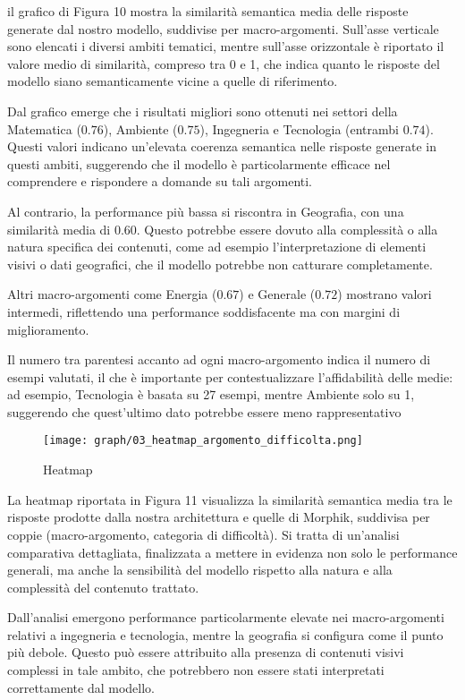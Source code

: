il grafico di Figura 10 mostra la similarità semantica media delle risposte generate dal nostro modello, suddivise per macro-argomenti. Sull’asse verticale sono elencati i diversi ambiti tematici, mentre sull’asse orizzontale è riportato il valore medio di similarità, compreso tra 0 e 1, che indica quanto le risposte del modello siano semanticamente vicine a quelle di riferimento.

Dal grafico emerge che i risultati migliori sono ottenuti nei settori della Matematica ($0.76$), Ambiente ($0.75$), Ingegneria e Tecnologia (entrambi $0.74$). Questi valori indicano un’elevata coerenza semantica nelle risposte generate in questi ambiti, suggerendo che il modello è particolarmente efficace nel comprendere e rispondere a domande su tali argomenti.

Al contrario, la performance più bassa si riscontra in Geografia, con una similarità media di $0.60$. Questo potrebbe essere dovuto alla complessità o alla natura specifica dei contenuti, come ad esempio l’interpretazione di elementi visivi o dati geografici, che il modello potrebbe non catturare completamente.

Altri macro-argomenti come Energia ($0.67$) e Generale ($0.72$) mostrano valori intermedi, riflettendo una performance soddisfacente ma con margini di miglioramento.

Il numero tra parentesi accanto ad ogni macro-argomento indica il numero di esempi valutati, il che è importante per contestualizzare l’affidabilità delle medie: ad esempio, Tecnologia è basata su 27 esempi, mentre Ambiente solo su 1, suggerendo che quest’ultimo dato potrebbe essere meno rappresentativo

\begin{figure}[H]
\centering
\texttt{[image: graph/03\_heatmap\_argomento\_difficolta.png]}
\caption{Heatmap}
\end{figure}
La heatmap riportata in Figura 11 visualizza la similarità semantica media tra le risposte prodotte dalla nostra architettura e quelle di Morphik, suddivisa per coppie (macro-argomento, categoria di difficoltà). Si tratta di un’analisi comparativa dettagliata, finalizzata a mettere in evidenza non solo le performance generali, ma anche la sensibilità del modello rispetto alla natura e alla complessità del contenuto trattato.

Dall’analisi emergono performance particolarmente elevate nei macro-argomenti relativi a ingegneria e tecnologia, mentre la geografia si configura come il punto più debole. Questo può essere attribuito alla presenza di contenuti visivi complessi in tale ambito, che potrebbero non essere stati interpretati correttamente dal modello.

